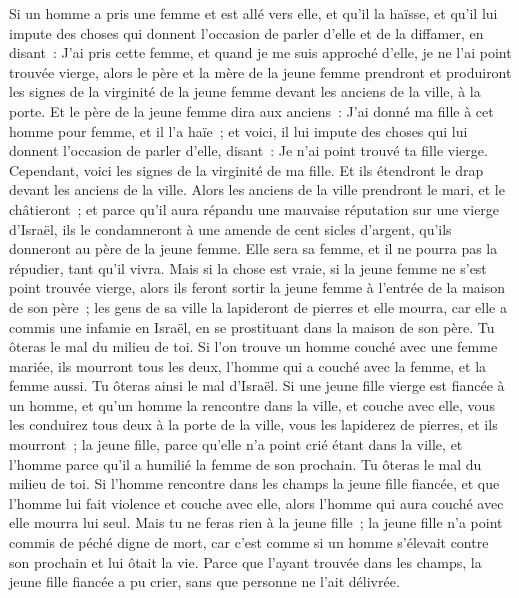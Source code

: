 \begin{multicols}{2}
Si un homme a pris une femme et est allé vers elle, et qu'il la haïsse,
et qu'il lui impute des choses qui donnent l'occasion de parler d'elle et de la diffamer, en disant~: J'ai pris cette femme, et quand je me suis approché d'elle, je ne l'ai point trouvée vierge,
alors le père et la mère de la jeune femme prendront et produiront les signes de la virginité de la jeune femme devant les anciens de la ville, à la porte.
Et le père de la jeune femme dira aux anciens~: J'ai donné ma fille à cet homme pour femme, et il l'a haïe~;
et voici, il lui impute des choses qui lui donnent l'occasion de parler d'elle, disant~: Je n'ai point trouvé ta fille vierge. Cependant, voici les signes de la virginité de ma fille. Et ils étendront le drap devant les anciens de la ville.
Alors les anciens de la ville prendront le mari, et le châtieront~;
et parce qu'il aura répandu une mauvaise réputation sur une vierge d'Israël, ils le condamneront à une amende de cent sicles d'argent, qu'ils donneront au père de la jeune femme. Elle sera sa femme, et il ne pourra pas la répudier, tant qu'il vivra.
Mais si la chose est vraie, si la jeune femme ne s'est point trouvée vierge,
alors ils feront sortir la jeune femme à l'entrée de la maison de son père~; les gens de sa ville la lapideront de pierres et elle mourra, car elle a commis une infamie en Israël, en se prostituant dans la maison de son père. Tu ôteras le mal du milieu de toi.
Si l'on trouve un homme couché avec une femme mariée, ils mourront tous les deux, l'homme qui a couché avec la femme, et la femme aussi. Tu ôteras ainsi le mal d'Israël.
Si une jeune fille vierge est fiancée à un homme, et qu'un homme la rencontre dans la ville, et couche avec elle,
vous les conduirez tous deux à la porte de la ville, vous les lapiderez de pierres, et ils mourront~; la jeune fille, parce qu'elle n'a point crié étant dans la ville, et l'homme parce qu'il a humilié la femme de son prochain. Tu ôteras le mal du milieu de toi.
Si l'homme rencontre dans les champs la jeune fille fiancée, et que l'homme lui fait violence et couche avec elle, alors l'homme qui aura couché avec elle mourra lui seul.
Mais tu ne feras rien à la jeune fille~; la jeune fille n'a point commis de péché digne de mort, car c'est comme si un homme s'élevait contre son prochain et lui ôtait la vie.
Parce que l'ayant trouvée dans les champs, la jeune fille fiancée a pu crier, sans que personne ne l'ait délivrée.

\end{multicols}
